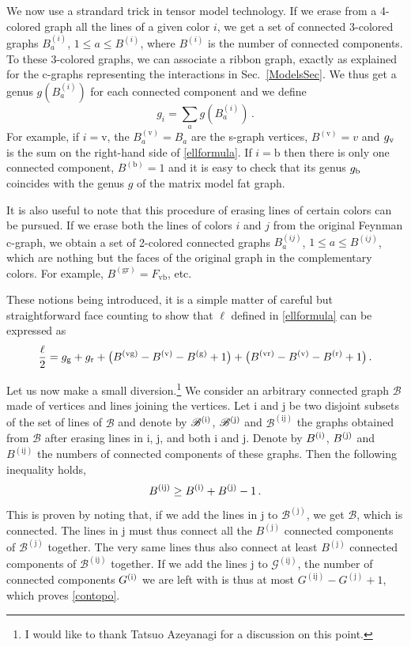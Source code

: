 \documentclass[12pt]{article}
\numberwithin{equation}{section}
\def\be{\begin{equation}}\def\ee{\end{equation}}
\begin{document}
We now use a strandard trick in tensor model technology. If we erase from a 4-colored graph all the lines of a given color $i$, we get a set of connected 3-colored graphs $B^{(i)}_{a}$, $1\leq a\leq B^{(i)}$, where $B^{(i)}$ is the number of connected components. To these 3-colored graphs, we can associate a ribbon graph, exactly as explained for the c-graphs representing the interactions in Sec.\ \ref{ModelsSec}. We thus get a genus $g(B^{(i)}_{a})$ for each connected component and we define
%
\be\label{sumg} g_{i}=\sum_{a} g(B^{(i)}_{a})\, .\ee
%
For example, if $i=\text{v}$, the $B^{(\text{v})}_{a}=B_{a}$ are the s-graph vertices, $B^{(\text{v})}=v$ and $g_{\text v}$ is the sum on the right-hand side of \eqref{ellformula}. If $i=\text{b}$ then there is only one connected component, $B^{(\text{b})}=1$ and it is easy to check that its genus $g_{\text b}$ coincides with the genus $g$ of the matrix model fat graph. 

It is also useful to note that this procedure of erasing lines of certain colors can be pursued. If we erase both the lines of colors $i$ and $j$ from the original Feynman c-graph, we obtain a set of 2-colored connected graphs $B^{(ij)}_{a}$, $1\leq a\leq B^{(ij)}$, which are nothing but the faces of the original graph in the complementary colors. For example, $B^{(\text{gr})}=F_{\text{vb}}$, etc.

These notions being introduced, it is a simple matter of careful but straightforward face counting to show that $\ell$ defined in \eqref{ellformula} can be expressed as
%
\be\label{ellformula2} \frac{\ell}{2} = g_{\text g} + g_{\text r} +\bigl(B^{(\text{vg})} - B^{(\text v)} - B^{(\text g)} + 1\bigr) + \bigl(
B^{(\text{vr})} - B^{(\text v)} - B^{(\text r)} + 1\bigr)\, .\ee
%

Let us now make a small diversion.\footnote{I would like to thank Tatsuo Azeyanagi for a discussion on this point.} We consider an arbitrary connected graph $\mathscr B$ made of vertices and lines joining the vertices. Let i and j be two disjoint subsets of the set of lines of $\mathscr B$ and denote by $\mathscr{B}^{(\text i)}$, $\mathscr{B}^{(\text j)}$ and $\mathscr{B}^{(\text{ij})}$ the graphs obtained from $\mathscr B$ after erasing lines in i, j, and both i and j. Denote by $B^{(\text i)}$, $B^{(\text j)}$ and $B^{(\text{ij})}$ the numbers of connected components of these graphs. Then the following inequality holds,
%
\be\label{contopo} B^{(\text{ij})}\geq B^{(\text i)} + B^{(\text j)} -1\, .\ee
%
This is proven by noting that, if we add the lines in j to $\mathscr{B}^{(\text{j})}$, we get $\mathscr B$, which is connected. The lines in j must thus connect all the $B^{(\text{j})}$ connected components of $\mathscr{B}^{(\text{j})}$ together. The very same lines thus also connect at least $B^{(\text{j})}$ connected components of $\mathscr{B}^{(\text{ij})}$ together. If we add the lines j to $\mathscr{G}^{(\text{ij})}$, the number of connected components $G^{(\text i)}$ we are left with is thus at most $G^{(\text{ij})}-G^{(\text{j})}+1$, which proves \eqref{contopo}.
\end{document}
